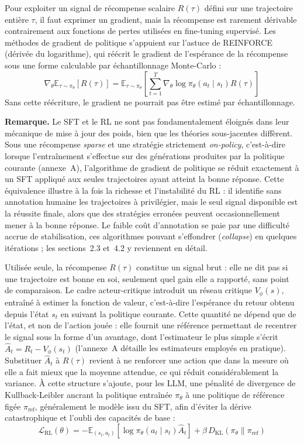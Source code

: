 \documentclass[11pt,a4paper]{article}
\begin{document}
Pour exploiter un signal de récompense scalaire $R(\tau)$ défini sur une trajectoire entière $\tau$, il faut exprimer un gradient, mais la récompense est rarement dérivable contrairement aux fonctions de pertes utilisées en fine-tuning supervisé. Les méthodes de gradient de politique s'appuient sur l'astuce de REINFORCE (dérivée du logarithme), qui réécrit le gradient de l'espérance de la récompense sous une forme calculable par échantillonnage Monte-Carlo :
\begin{equation}
\nabla_\theta \mathbb{E}_{\tau \sim \pi_\theta}[R(\tau)] = \mathbb{E}_{\tau \sim \pi_\theta} \left[ \sum_{t=1}^T \nabla_\theta \log \pi_\theta(a_t \mid s_t) R(\tau) \right]
\end{equation}
Sans cette réécriture, le gradient ne pourrait pas être estimé par échantillonnage.

\textbf{Remarque.} Le SFT et le RL ne sont pas fondamentalement éloignés dans leur mécanique de mise à jour des poids, bien que les théories sous-jacentes diffèrent. Sous une récompense \emph{sparse} et une stratégie strictement \emph{on-policy}, c'est-à-dire lorsque l'entraînement s'effectue sur des générations produites par la politique courante (annexe~A), l'algorithme de gradient de politique se réduit exactement à un SFT appliqué aux seules trajectoires ayant atteint la bonne réponse. Cette équivalence illustre à la fois la richesse et l'instabilité du RL : il identifie sans annotation humaine les trajectoires à privilégier, mais le seul signal disponible est la réussite finale, alors que des stratégies erronées peuvent occasionnellement mener à la bonne réponse. Le faible coût d'annotation se paie par une difficulté accrue de stabilisation, ces algorithmes pouvant s'effondrer (\emph{collapse}) en quelques itérations ; les sections~2.3 et~4.2 y reviennent en détail.

Utilisée seule, la récompense $R(\tau)$ constitue un signal brut : elle ne dit pas si une trajectoire est bonne en soi, seulement quel gain elle a rapporté, sans point de comparaison. Le cadre acteur-critique introduit un réseau critique $V_\phi(s)$, entraîné à estimer la fonction de valeur, c'est-à-dire l'espérance du retour obtenu depuis l'état $s_t$ en suivant la politique courante. Cette quantité ne dépend que de l'état, et non de l'action jouée : elle fournit une référence permettant de recentrer le signal sous la forme d'un avantage, dont l'estimateur le plus simple s'écrit $\hat{A}_t = R_t - V_\phi(s_t)$ (l'annexe~A détaille les estimateurs employés en pratique). Substituer $\hat{A}_t$ à $R(\tau)$ revient à ne renforcer une action que dans la mesure où elle a fait mieux que la moyenne attendue, ce qui réduit considérablement la variance. À cette structure s'ajoute, pour les LLM, une pénalité de divergence de Kullback-Leibler ancrant la politique entraînée $\pi_\theta$ à une politique de référence figée $\pi_{\text{ref}}$, généralement le modèle issu du SFT, afin d'éviter la dérive catastrophique et l'oubli des capacités de base :
\begin{equation}
\mathcal{L}_{\text{RL}}(\theta) = -\mathbb{E}_{(s_t, a_t)} \left[ \log \pi_\theta(a_t \mid s_t) \hat{A}_t \right] + \beta \, D_{\text{KL}}(\pi_\theta \parallel \pi_{\text{ref}})
\end{equation}
\end{document}
